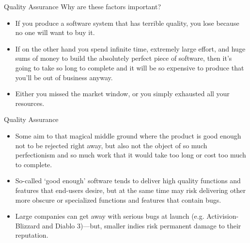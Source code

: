 \begin{frame}{Quality Assurance}
Why are these factors important? \pause

    \begin{itemize}
        \item If you produce a software system that has terrible quality, you lose because no one will want to buy it.  \pause
        \item If on the other hand you spend infinite time, extremely large effort, and huge sums of money to build the absolutely perfect piece of software,
         then it's going to take so long to complete and it will be so expensive to produce that you'll be out of business anyway.  \pause
        \item Either you missed the market window, or you simply exhausted all your resources. 
    \end{itemize}
\end{frame}

\begin{frame}{Quality Assurance}
    \begin{itemize}
        \item Some aim to that magical middle ground where the product is good enough not to be rejected right away, but also not the object of so much 
        perfectionism and so much work that it would take too long or cost too much to complete.  \pause
        \item So-called `good enough' software tends to deliver high quality functions and features that end-users desire, but at the same time may risk delivering
        other more obscure or specialized functions and features that contain bugs. \pause
        \item Large companies can get away with serious bugs at launch (e.g. Activision-Blizzard and Diablo 3)---but, smaller indies risk permanent damage to their reputation.
    \end{itemize}
\end{frame}


